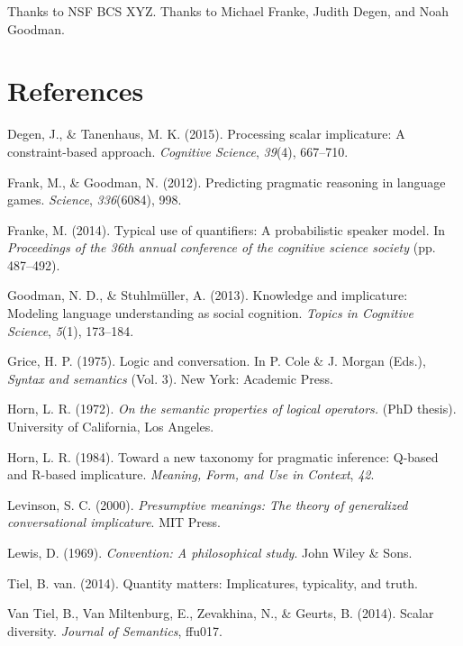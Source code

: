 \documentclass[10pt, letterpaper]{article}
\begin{document}
Thanks to NSF BCS XYZ. Thanks to Michael Franke, Judith Degen, and Noah
Goodman.

\section{References}\label{references}

\setlength{\parindent}{-0.1in} \setlength{\leftskip}{0.125in} \noindent

Degen, J., \& Tanenhaus, M. K. (2015). Processing scalar implicature: A
constraint-based approach. \emph{Cognitive Science}, \emph{39}(4),
667--710.

Frank, M., \& Goodman, N. (2012). Predicting pragmatic reasoning in
language games. \emph{Science}, \emph{336}(6084), 998.

Franke, M. (2014). Typical use of quantifiers: A probabilistic speaker
model. In \emph{Proceedings of the 36th annual conference of the
cognitive science society} (pp. 487--492).

Goodman, N. D., \& Stuhlm{ü}ller, A. (2013). Knowledge and implicature:
Modeling language understanding as social cognition. \emph{Topics in
Cognitive Science}, \emph{5}(1), 173--184.

Grice, H. P. (1975). Logic and conversation. In P. Cole \& J. Morgan
(Eds.), \emph{Syntax and semantics} (Vol. 3). New York: Academic Press.

Horn, L. R. (1972). \emph{On the semantic properties of logical
operators.} (PhD thesis). University of California, Los Angeles.

Horn, L. R. (1984). Toward a new taxonomy for pragmatic inference:
Q-based and R-based implicature. \emph{Meaning, Form, and Use in
Context}, \emph{42}.

Levinson, S. C. (2000). \emph{Presumptive meanings: The theory of
generalized conversational implicature}. MIT Press.

Lewis, D. (1969). \emph{Convention: A philosophical study}. John Wiley
\& Sons.

Tiel, B. van. (2014). Quantity matters: Implicatures, typicality, and
truth.

Van Tiel, B., Van Miltenburg, E., Zevakhina, N., \& Geurts, B. (2014).
Scalar diversity. \emph{Journal of Semantics}, ffu017.
\end{document}

